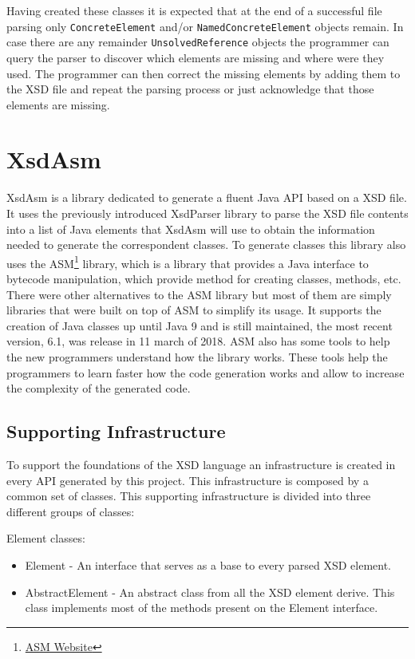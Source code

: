 \noindent
Having created these classes it is expected that at the end of a successful file parsing only \texttt{ConcreteElement} and/or \texttt{NamedConcreteElement} objects remain. In case there are any remainder \texttt{UnsolvedReference} objects the programmer can query the parser to discover which elements are missing and where were they used. The programmer can then correct the missing elements by adding them to the \ac{XSD} file and repeat the parsing process or just acknowledge that those elements are missing. 

\section{XsdAsm} %
\label{sec:xsdasm}

XsdAsm is a library dedicated to generate a fluent Java \ac{API} based on a \ac{XSD} file. It uses the previously introduced XsdParser library to parse the \ac{XSD} file contents into a list of Java elements that XsdAsm will use to obtain the information needed to generate the correspondent classes. To generate classes this library also uses the ASM\footnote{\href{http://asm.ow2.org/}{ASM Website}} library, which is a library that provides a Java interface to bytecode manipulation, which provide method for creating classes, methods, etc. There were other alternatives to the ASM library but most of them are simply libraries that were built on top of ASM to simplify its usage. It supports the creation of Java classes up until Java 9 and is still maintained, the most recent version, 6.1, was release in 11 march of 2018. ASM also has some tools to help the new programmers understand how the library works. These tools help the programmers to learn faster how the code generation works and allow to increase the complexity of the generated code.

\subsection{Supporting Infrastructure}
\label{sec:supportinginfrastructure}

To support the foundations of the \ac{XSD} language an infrastructure is created in every \ac{API} generated by this project. This infrastructure is composed by a common set of classes. This supporting infrastructure is divided into three different groups of classes:

Element classes:

\begin{itemize}  
	\item Element - An interface that serves as a base to every parsed \ac{XSD} element.
	\item AbstractElement - An abstract class from all the \ac{XSD} element derive. This class implements most of the methods present on the Element interface.
\end{itemize}

